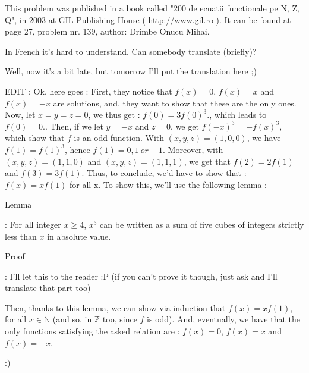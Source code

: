 


\begin{solution}
	This problem was published in a book called "200 de ecuatii functionale pe N, Z, Q", in 2003 at GIL Publishing House ( http://www.gil.ro ). It can be found at page 27, problem nr. 139, author: Drimbe Onucu Mihai.
\end{solution}



\begin{solution}
	In French it's hard to understand. Can somebody translate (briefly)?
\end{solution}



\begin{solution}
	Well, now it's a bit late, but tomorrow I'll put the translation here ;)


EDIT : Ok, here goes :
First, they notice that $f(x) = 0$, $f(x) = x$ and $f(x) = -x$ are solutions, and, they want to show that these are the only ones.
Now, let $x=y=z=0$, we thus get : $f(0) = 3f(0)^3$., which leads to $f(0)=0$..
Then, if we let $y=-x$ and $z=0$, we get $f(-x)^3 = -f(x)^3$, which show that $f$ is an odd function.
With $(x,y,z) = (1,0,0)$, we have $f(1) = f(1)^3$, hence $f(1) = 0, 1 \ or -1$.
Moreover, with $(x,y,z)=(1,1,0)$ and $(x,y,z)=(1,1,1)$, we get that $f(2) = 2f(1)$ and $f(3) = 3f(1)$.
Thus, to conclude, we'd have to show that : $f(x) = xf(1)$ for all x.
To show this, we'll use the following lemma :
\begin{bolded}Lemma\end{bolded} : For all integer $x \ge 4$, $x^3$ can be written as a sum of five cubes of integers strictly less than $x$ in absolute value.
\begin{bolded}Proof\end{bolded} : I'll let this to the reader  :P  (if you can't prove it though, just ask and I'll translate that part too)

Then, thanks to this lemma, we can show via induction that $f(x) = xf(1)$, for all $x \in \mathbb{N}$ (and so, in $\mathbb{Z}$ too, since $f$ is odd).
And, eventually, we have that the only functions satisfying the asked relation are : 
$f(x) = 0$, $f(x) = x$ and $f(x) = -x$.

:)
\end{solution}



